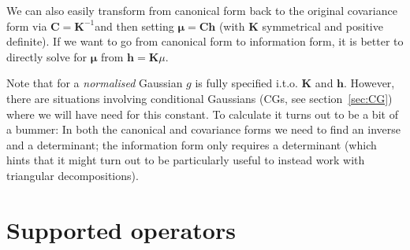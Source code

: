 \documentclass[oneside,english]{scrbook}
\begin{document}
We can also easily transform from canonical form back to the original
covariance form via $\bm{C}=\bm{K}^{-1}$and then setting $\bm{\mu}=\bm{C}\bm{h}$
(with $\bm{K}$ symmetrical and positive definite). If we want to go from
canonical form to information form, it is better to directly solve
for $\bm{\mu}$ from $\bm{\bm{h}}=\bm{K}\mu$.

Note that for a \emph{normalised} Gaussian $g$ is fully specified
i.t.o. $\bm{K}$ and $\bm{h}$. However, there are situations involving
conditional Gaussians (CGs, see section~\ref{sec:CG}) where we will
have need for this constant. To calculate it turns out to be a bit of
a bummer: In both the canonical and covariance forms we need to find
an inverse and a determinant; the information form only requires a
determinant (which hints that it might turn out to be particularly
useful to instead work with triangular decompositions).

\section{Supported operators}
\end{document}
